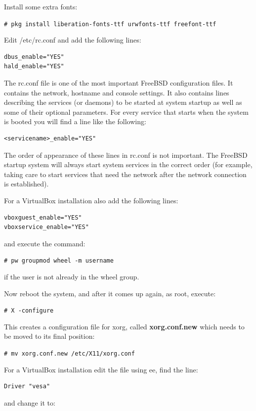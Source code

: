 \documentclass[a4paper,twoside,12pt]{article}
\newcommand{\coderoot}[1]{\texttt{\# #1}}
\begin{document}
Install some extra fonts:

\coderoot{pkg install liberation-fonts-ttf urwfonts-ttf freefont-ttf}

Edit /etc/rc.conf and add the following lines:

\begin{verbatim}
dbus_enable="YES"
hald_enable="YES"
\end{verbatim}

The rc.conf file is one of the most important FreeBSD configuration files. It contains the network, hostname and console settings. It also contains lines describing the services (or daemons) to be started at system startup as well as some of their optional parameters. For every service that starts when the system is booted you will find a line like the following:

\begin{verbatim}
<servicename>_enable="YES"
\end{verbatim}

The order of appearance of these lines in rc.conf is not important. The FreeBSD startup system will always start system services in the correct order (for example, taking care to start services that need the network after the network connection is established).

For a VirtualBox installation also add the following lines:

\begin{verbatim}
vboxguest_enable="YES"
vboxservice_enable="YES"
\end{verbatim}

and execute the command:

\coderoot{pw groupmod wheel -m username}

if the user is not already in the wheel group.

Now reboot the system, and after it comes up again, as root, execute:

\coderoot{X -configure}

This creates a configuration file for xorg, called \textbf{xorg.conf.new} which needs to be moved to its final position:

\coderoot{mv xorg.conf.new /etc/X11/xorg.conf}

For a VirtualBox installation edit the file using ee, find the line:

\begin{verbatim}
Driver "vesa"
\end{verbatim}

and change it to:
\end{document}
